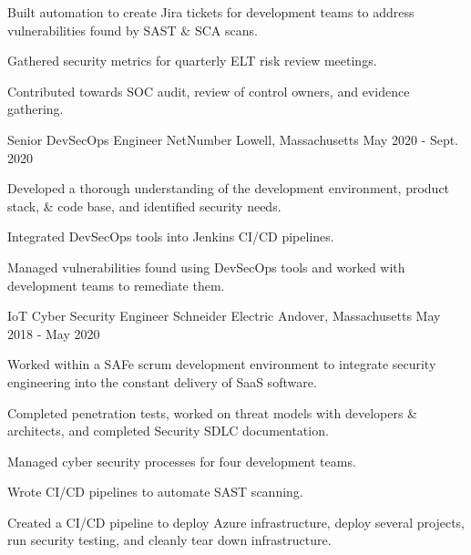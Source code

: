 \begin{cventries}
{\begin{cvitems}
{        }
        \item {
          Built automation to create Jira tickets for development teams to address vulnerabilities found by SAST \& SCA scans.
        }
        \item {
          Gathered security metrics for quarterly ELT risk review meetings.
        }
        \item {
          Contributed towards SOC audit, review of control owners, and evidence gathering.
        }
      \end{cvitems}
    }

  \cventry
    {Senior DevSecOps Engineer} %
    {NetNumber} %
    {Lowell, Massachusetts} %
    {May 2020 - Sept. 2020} %
    {
      \begin{cvitems} %
        \item {
          Developed a thorough understanding of the development environment, product stack, \& code base, and identified security needs.
        }
        \item {
          Integrated DevSecOps tools into Jenkins CI/CD pipelines.
        }
        \item {
          Managed vulnerabilities found using DevSecOps tools and worked with development teams to remediate them.
        }
      \end{cvitems}
    }

  \cventry
    {IoT Cyber Security Engineer} %
    {Schneider Electric} %
    {Andover, Massachusetts} %
    {May 2018 - May 2020} %
    {
      \begin{cvitems} %
        \item {
          Worked within a SAFe scrum development environment to integrate security engineering into the constant delivery of SaaS software.
        }
        \item {
          Completed penetration tests, worked on threat models with developers \& architects, and completed Security SDLC documentation.
        }
        \item {
          Managed cyber security processes for four development teams.
        }
        \item {
          Wrote CI/CD pipelines to automate SAST scanning.
        }
        \item {
          Created a CI/CD pipeline to deploy Azure infrastructure, deploy several projects, run security testing, and cleanly tear down infrastructure.
        }
      \end{cvitems}
    }


\end{cventries}

